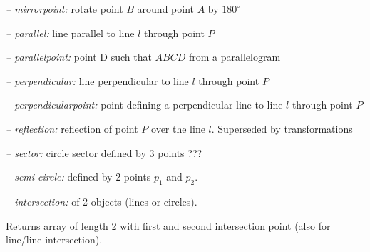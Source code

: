 \par{\sl -- mirrorpoint:} \hfill rotate point $B$ around point $A$ by $180^\circ$
\par{\sl -- parallel:} \hfill line parallel to line $l$ through point $P$
\par{\sl -- parallelpoint:} \hfill point D such that $ABCD$ from a parallelogram
\par{\sl -- perpendicular:} \hfill line perpendicular to line $l$ through point $P$
\par{\sl -- perpendicularpoint:} \hfill  point defining a perpendicular line to line $l$ through point $P$


\par{\sl -- reflection:} \hfill reflection of point $P$ over the line $l$. 
Superseded by transformations

\par{\sl -- sector:} \hfill circle sector defined by 3 points \hfill ???

\par{\sl -- semi circle:} \hfill defined by 2 points $p_1$ and $p_2$.

\par{\sl -- intersection:} \hfill of 2 objects (lines or circles). 

Returns array of length 2 with first and second intersection point (also for line/line intersection).


